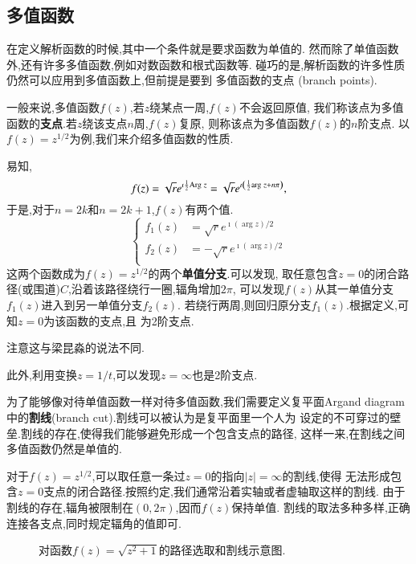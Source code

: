 \subsection{多值函数}
在定义解析函数的时候,其中一个条件就是要求函数为单值的.
然而除了单值函数外,还有许多多值函数,例如对数函数和根式函数等.
碰巧的是,解析函数的许多性质仍然可以应用到多值函数上,但前提是要到
多值函数的支点 (branch points).

一般来说,多值函数$f(z)$,若$z$绕某点一周,$f(z)$不会返回原值,
我们称该点为多值函数的\textbf{支点}.若$z$绕该支点$n$周,$f(z)$复原,
则称该点为多值函数$f(z)$的$n$阶支点.
以$f(z) = z^{1/2}$为例,我们来介绍多值函数的性质.

易知,\[
    f(z) = \sqrt{r} e^{\imath {\frac{1}{2}}  {\mathrm{Arg}\;} z}
    =  \sqrt{r} e^{\imath \left( {\frac{1}{2}} {\mathrm{arg}\;} z + n \pi \right)},
    \]
于是,对于$n= 2k$和$n=2k+1$,$f(z)$有两个值.
\begin{equation}
    \left\{\begin{aligned}
    f_1(z) & =\sqrt{r}  e^{\imath(\arg z) / 2} \\
    f_2(z) & =-\sqrt{r}  e^{\imath(\arg z) / 2} \\
    \end{aligned}\right.
\end{equation}
这两个函数成为$f(z)= z^{1/2}$的两个\textbf{单值分支}.可以发现,
取任意包含$z=0$的闭合路径(或围道)$C$,沿着该路径绕行一圈,辐角增加$2\pi$,
可以发现$f(z)$从其一单值分支$f_1(z)$进入到另一单值分支$f_2(z)$.
若绕行两周,则回归原分支$f_1(z)$.根据定义,可知$z=0$为该函数的支点,且
为2阶支点.
\begin{note}
注意这与梁昆淼的说法不同.
\end{note}

此外,利用变换$z=1/t$,可以发现$z=\infty$也是2阶支点.

为了能够像对待单值函数一样对待多值函数,我们需要定义复平面Argand diagram
中的\textbf{割线}(branch cut).割线可以被认为是复平面里一个人为
设定的不可穿过的壁垒.割线的存在,使得我们能够避免形成一个包含支点的路径,
这样一来,在割线之间多值函数仍然是单值的.

对于$f(z)=z^{1/2}$,可以取任意一条过$z=0$的指向$|z|=\infty$的割线,使得
无法形成包含$z=0$支点的闭合路径.按照约定,我们通常沿着实轴或者虚轴取这样的割线.
由于割线的存在,辐角被限制在$(0,2\pi)$,因而$f(z)$保持单值.
割线的取法多种多样,正确连接各支点,同时规定辐角的值即可.

\begin{figure}[htbp]
    \centering
    
    \caption{对函数$f(z) = \sqrt{z^2 + 1}$的路径选取和割线示意图.}
    \label{fig:contours}
\end{figure}

